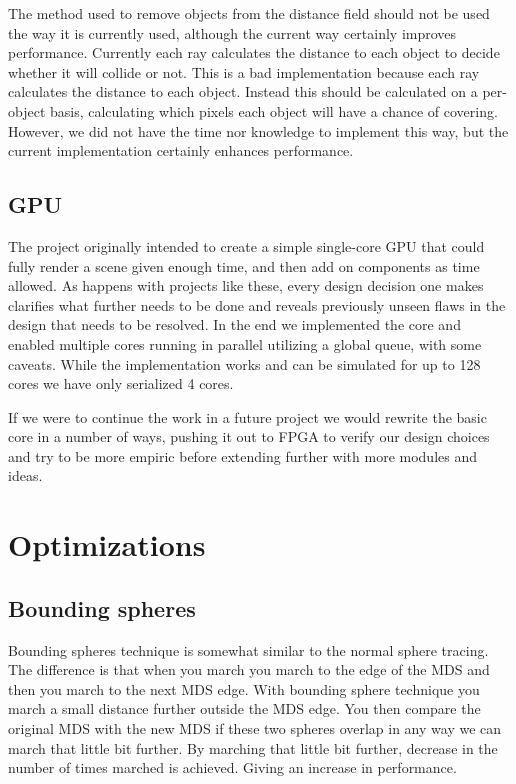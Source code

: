 			The method used to remove objects from the distance field should
			not be used the way it is currently used, although the current way
			certainly improves performance. Currently each ray calculates the
			distance to each object to decide whether it will collide or not. 
			This is a bad implementation because each ray calculates the 
			distance to each object. Instead this should be calculated on a 
			per-object basis, calculating which pixels each object will have
			a chance of covering. However, we did not have the time nor
			knowledge to implement this way, but the current implementation
			certainly enhances performance.



		
		\subsection{GPU} 
		
			The project originally intended to create a simple single-core GPU
			that could fully render a scene given enough time, and then add on
			components as time allowed. As happens with projects like these,
			every design decision one makes clarifies what further needs to be
			done and reveals previously unseen flaws in the design that needs
			to be resolved. In the end we implemented the core and enabled
			multiple cores running in parallel utilizing a global queue, with
			some caveats. While the implementation works and can be simulated
			for up to 128 cores we have only serialized 4 cores. 
			
			If we were to continue the work in a future project we would
			rewrite the basic core in a number of ways, pushing it out to FPGA
			to verify our design choices and try to be more empiric before
			extending further with more modules and ideas. 

	\section{Optimizations}

		\subsection{Bounding spheres}
	
			Bounding spheres technique is somewhat similar to the normal sphere
			tracing. The difference is that when you march you march to the
			edge of the MDS and then you march to the next MDS edge. With
			bounding sphere technique you march a small distance further
			outside the MDS edge. You then compare the original MDS with the
			new MDS if these two spheres overlap in any way we can march that
			little bit further. By marching that little bit further, decrease
			in the number of times marched is achieved. Giving an increase in
			performance. 
			
